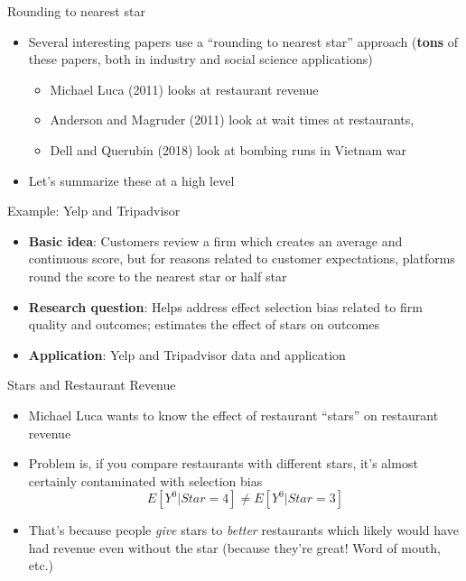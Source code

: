 \documentclass{beamer}
\begin{document}
\begin{frame}{Rounding to nearest star}

\begin{itemize}
\item Several interesting papers use a ``rounding to nearest star'' approach (\textbf{tons} of these papers, both in industry and social science applications)
	\begin{itemize}
	\item Michael Luca (2011) looks at restaurant revenue
	\item Anderson and Magruder (2011) look at wait times at restaurants, 
	\item Dell and Querubin (2018) look at bombing runs in Vietnam war
	\end{itemize}
\item Let's summarize these at a high level
\end{itemize}

\end{frame}

\begin{frame}{Example: Yelp and Tripadvisor}

\begin{itemize}
\item \textbf{Basic idea}: Customers review a firm which creates an average and continuous score, but for reasons related to customer expectations, platforms round the score to the nearest star or half star
\item \textbf{Research question}: Helps address effect selection bias related to firm quality and outcomes; estimates the effect of stars on outcomes
\item \textbf{Application}: Yelp and Tripadvisor data and application
\end{itemize}

\end{frame}

\begin{frame}{Stars and Restaurant Revenue}

\begin{itemize}

\item Michael Luca wants to know the effect of restaurant ``stars'' on restaurant revenue
\item Problem is, if you compare restaurants with different stars, it's almost certainly contaminated with selection bias$$E[Y^0|Star=4] \neq E[Y^0|Star=3]$$
\item That's because people \emph{give} stars to \emph{better} restaurants which likely would have had revenue even without the star (because they're great!  Word of mouth, etc.)
\end{itemize}

\end{frame}
\end{document}
